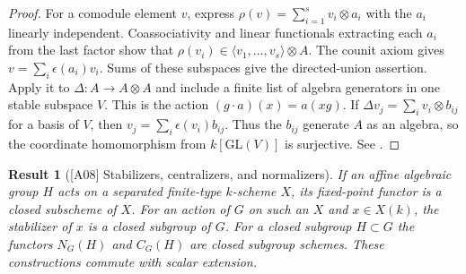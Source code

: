\documentclass[11pt,a4paper,openany,oneside]{book}
\theoremstyle{resultstyle}
\newtheorem{statement}{Result}[chapter]
\newenvironment{result}[2]{\clubpenalty=10000\begin{statement}[\textnormal{[#1]} #2]\leavevmode\label{res:#1}\ignorespaces}{\end{statement}}
\theoremstyle{definition}
\numberwithin{equation}{chapter}
\begin{document}
\begin{proof}
For a comodule element \(v\), express
\(\rho(v)=\sum_{i=1}^s v_i\otimes a_i\) with the \(a_i\) linearly
independent. Coassociativity and linear functionals extracting each
\(a_i\) from the last factor show that
\(\rho(v_i)\in\langle v_1,\ldots,v_s\rangle\otimes A\).
The counit axiom gives \(v=\sum_i\epsilon(a_i)v_i\).
Sums of these subspaces give the directed-union assertion.
Apply it to \(\Delta:A\to A\otimes A\) and include a finite list of
algebra generators in one stable subspace \(V\). This is the action
\((g\cdot a)(x)=a(xg)\). If \(\Delta v_j=\sum_i v_i\otimes b_{ij}\)
for a basis of \(V\), then \(v_j=\sum_i\epsilon(v_i)b_{ij}\).
Thus the \(b_{ij}\) generate \(A\) as an algebra, so the coordinate
homomorphism from \(k[\mathrm{GL}(V)]\) is surjective.
See \cite[Proposition 4.7, Theorem 4.9 and Corollary 4.10]{milne}.
\end{proof}

\begin{result}{A08}{Stabilizers, centralizers, and normalizers}
If an affine algebraic group \(H\) acts on a separated finite-type
\(k\)-scheme \(X\), its fixed-point functor is a closed subscheme of \(X\).
For an action of \(G\) on such an \(X\) and \(x\in X(k)\), the stabilizer
of \(x\) is a closed subgroup of \(G\). For a closed subgroup \(H\subset G\)
the functors \(N_G(H)\) and \(C_G(H)\) are closed subgroup schemes.
These constructions commute with scalar extension.
\end{result}
\end{document}
